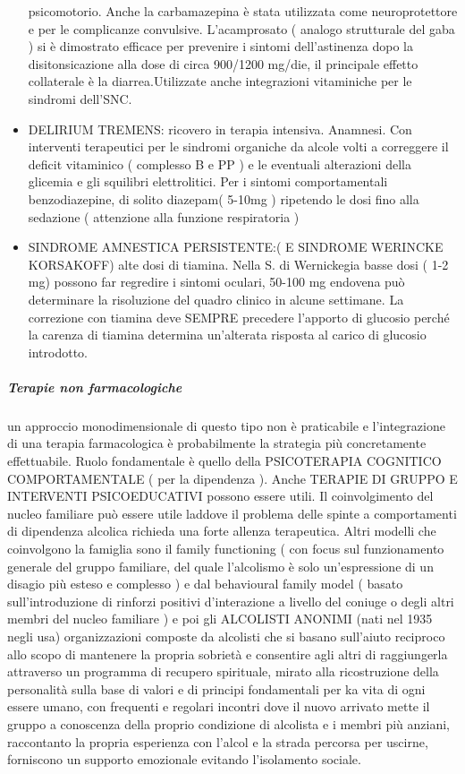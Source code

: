 \begin{itemize}
psicomotorio. Anche la carbamazepina è stata utilizzata come
neuroprotettore e per le complicanze convulsive. L'acamprosato ( analogo
strutturale del gaba ) si è dimostrato efficace per prevenire i sintomi
dell'astinenza dopo la disitonsicazione alla dose di circa 900/1200
mg/die, il principale effetto collaterale è la diarrea.Utilizzate anche
integrazioni vitaminiche per le sindromi dell'SNC.
\item
DELIRIUM TREMENS: ricovero in terapia intensiva. Anamnesi. Con
interventi terapeutici per le sindromi organiche da alcole volti a
correggere il deficit vitaminico ( complesso B e PP ) e le eventuali
alterazioni della glicemia e gli squilibri elettrolitici. Per i sintomi
comportamentali benzodiazepine, di solito diazepam( 5-10mg ) ripetendo
le dosi fino alla sedazione ( attenzione alla funzione respiratoria )
\item
SINDROME AMNESTICA PERSISTENTE:( E SINDROME WERINCKE KORSAKOFF) alte
dosi di tiamina. Nella S. di Wernickegia basse dosi ( 1-2 mg) possono
far regredire i sintomi oculari, 50-100 mg endovena può determinare la
risoluzione del quadro clinico in alcune settimane. La correzione con
tiamina deve SEMPRE precedere l'apporto di glucosio perché la carenza di
tiamina determina un'alterata risposta al carico di glucosio introdotto.
\end{itemize}

\subparagraph{\textbf{\emph{Terapie non farmacologiche}}}

un approccio monodimensionale di questo tipo non è praticabile e
l'integrazione di una terapia farmacologica è probabilmente la strategia
più concretamente effettuabile. Ruolo fondamentale è quello della
PSICOTERAPIA COGNITICO COMPORTAMENTALE ( per la dipendenza ). Anche
TERAPIE DI GRUPPO E INTERVENTI PSICOEDUCATIVI possono essere utili. Il
coinvolgimento del nucleo familiare può essere utile laddove il problema
delle spinte a comportamenti di dipendenza alcolica richieda una forte
allenza terapeutica. Altri modelli che coinvolgono la famiglia sono il
family functioning ( con focus sul funzionamento generale del gruppo
familiare, del quale l'alcolismo è solo un'espressione di un disagio più
esteso e complesso ) e dal behavioural family model ( basato
sull'introduzione di rinforzi positivi d'interazione a livello del
coniuge o degli altri membri del nucleo familiare ) e poi gli ALCOLISTI
ANONIMI (nati nel 1935 negli usa) organizzazioni composte da alcolisti
che si basano sull'aiuto reciproco allo scopo di mantenere la propria
sobrietà e consentire agli altri di raggiungerla attraverso un programma
di recupero spirituale, mirato alla ricostruzione della personalità
sulla base di valori e di principi fondamentali per ka vita di ogni
essere umano, con frequenti e regolari incontri dove il nuovo arrivato
mette il gruppo a conoscenza della proprio condizione di alcolista e i
membri più anziani, raccontanto la propria esperienza con l'alcol e la
strada percorsa per uscirne, forniscono un supporto emozionale evitando
l'isolamento sociale.


